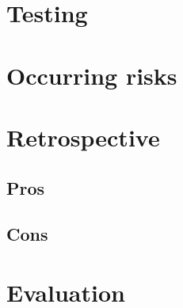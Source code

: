 \section{Testing}


\section{Occurring risks}
\section{Retrospective}
\subsection{Pros}
\subsection{Cons}
\section{Evaluation}